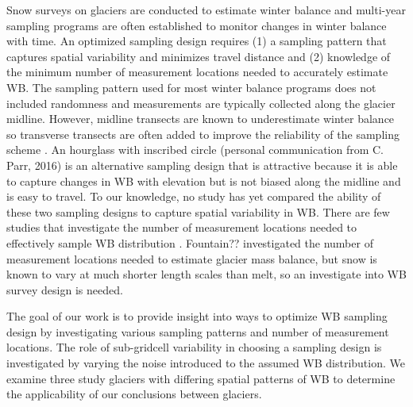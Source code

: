 \documentclass[twocolumn, letterpaper]{igs}
\begin{document}
Snow surveys on glaciers are conducted to estimate winter balance and multi-year sampling programs are often established to monitor changes in winter balance with time. An optimized sampling design requires (1) a sampling pattern that captures spatial variability and minimizes travel distance and (2) knowledge of the minimum number of measurement locations needed to accurately estimate WB. The sampling pattern used for most winter balance programs does not included randomness and measurements are typically collected along the glacier midline. However, midline transects are known to underestimate winter balance so transverse transects are often added to improve the reliability of the sampling scheme \citep[e.g.][]{Walmsley2015}. An hourglass with inscribed circle (personal communication from C. Parr, 2016) is an alternative sampling design that is attractive because it is able to capture changes in WB with elevation but is not biased along the midline and is easy to travel. To our knowledge, no study has yet compared the ability of these two sampling designs to capture spatial variability in WB. There are few studies that investigate the number of measurement locations needed to effectively sample WB distribution \citep[c.f.][]{Walmsley2015}. Fountain?? investigated the number of measurement locations needed to estimate glacier mass balance, but snow is known to vary at much shorter length scales than melt, so an investigate into WB survey design is needed. 

The goal of our work is to provide insight into ways to optimize WB sampling design by investigating various sampling patterns and number of measurement locations. The role of sub-gridcell variability in choosing a sampling design is investigated by varying the noise introduced to the assumed WB distribution. We examine three study glaciers with differing spatial patterns of WB to determine the applicability of our conclusions between glaciers. 
\end{document}

